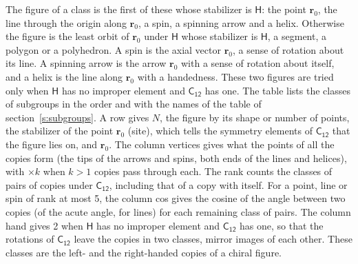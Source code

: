 \documentclass[10pt,a4paper]{article}
\numberwithin{equation}{section}
\newcommand{\grp}[1]{\mathsf{#1}}
\newcommand{\pointr}{\mathbf{r}}
\begin{document}
\leavevmode\label{n:head.figure}The figure of a class is the first of these whose stabilizer is $\grp{H}$: the point $\pointr_0$, the line through the origin along $\pointr_0$, a spin, a spinning arrow and a helix. Otherwise the figure is the least orbit of $\pointr_0$ under $\grp{H}$ whose stabilizer is $\grp{H}$, a segment, a polygon or a polyhedron. A spin is the axial vector $\pointr_0$, a sense of rotation about its line. A spinning arrow is the arrow $\pointr_0$ with a sense of rotation about itself, and a helix is the line along $\pointr_0$ with a handedness. These two figures are tried only when $\grp{H}$ has no improper element and $\grp{C_{12}}$ has one. The table lists the classes of subgroups in the order and with the names of the table of section~\ref{s:subgroups}. \label{n:head.site}A row gives $N$, the figure by its shape or number of points, the stabilizer of the point $\pointr_0$ (site), which tells the symmetry elements of $\grp{C_{12}}$ that the figure lies on, and $\pointr_0$. \label{n:head.vertices}The column vertices gives what the points of all the copies form (the tips of the arrows and spins, both ends of the lines and helices), with ${\times}k$ when $k > 1$ copies pass through each. \label{n:head.rank}The rank counts the classes of pairs of copies under $\grp{C_{12}}$, including that of a copy with itself. \label{n:head.cos}For a point, line or spin of rank at most 5, the column cos gives the cosine of the angle between two copies (of the acute angle, for lines) for each remaining class of pairs. \label{n:head.hand}The column hand gives 2 when $\grp{H}$ has no improper element and $\grp{C_{12}}$ has one, so that the rotations of $\grp{C_{12}}$ leave the copies in two classes, mirror images of each other. These classes are the left- and the right-handed copies of a chiral figure.
\end{document}

